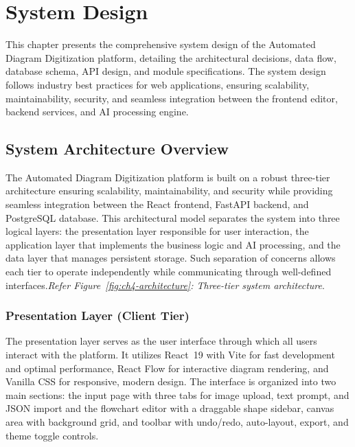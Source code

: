 
\chapter{System Design}
\label{ch:systemdesign}

\justifying
This chapter presents the comprehensive system design of the Automated Diagram Digitization platform, detailing the architectural decisions, data flow, database schema, API design, and module specifications. The system design follows industry best practices for web applications, ensuring scalability, maintainability, security, and seamless integration between the frontend editor, backend services, and AI processing engine.


\section{System Architecture Overview}
\label{sec:architecture}

\justifying
The Automated Diagram Digitization platform is built on a robust three-tier architecture ensuring scalability, maintainability, and security while providing seamless integration between the React frontend, FastAPI backend, and PostgreSQL database. This architectural model separates the system into three logical layers: the presentation layer responsible for user interaction, the application layer that implements the business logic and AI processing, and the data layer that manages persistent storage. Such separation of concerns allows each tier to operate independently while communicating through well-defined interfaces.\textit{Refer Figure~\ref{fig:ch4-architecture}: Three-tier system architecture}.


\subsection{Presentation Layer (Client Tier)}

\justifying
The presentation layer serves as the user interface through which all users interact with the platform. It utilizes React~19 with Vite for fast development and optimal performance, React Flow for interactive diagram rendering, and Vanilla CSS for responsive, modern design.
The interface is organized into two main sections: the input page with three tabs for image upload, text prompt, and JSON import and the flowchart editor with a draggable shape sidebar, canvas area with background grid, and toolbar with undo/redo, auto-layout, export, and theme toggle controls.

